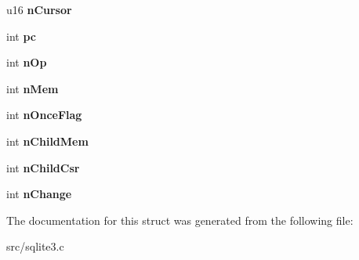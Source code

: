 \begin{DoxyCompactItemize}
\item 
\hypertarget{struct_vdbe_frame_af6d743df3f86ff683959562c1b615655}{u16 {\bfseries n\-Cursor}}\label{struct_vdbe_frame_af6d743df3f86ff683959562c1b615655}

\item 
\hypertarget{struct_vdbe_frame_aed0e6d8cb1908580a3c2aca04516b46c}{int {\bfseries pc}}\label{struct_vdbe_frame_aed0e6d8cb1908580a3c2aca04516b46c}

\item 
\hypertarget{struct_vdbe_frame_acffd5d53fbb5cb55e257c34a547c1762}{int {\bfseries n\-Op}}\label{struct_vdbe_frame_acffd5d53fbb5cb55e257c34a547c1762}

\item 
\hypertarget{struct_vdbe_frame_ab340f2b5f6d6e09a872f5f8a64fec245}{int {\bfseries n\-Mem}}\label{struct_vdbe_frame_ab340f2b5f6d6e09a872f5f8a64fec245}

\item 
\hypertarget{struct_vdbe_frame_a04707991a2907a48a1c3b76f3da4d26b}{int {\bfseries n\-Once\-Flag}}\label{struct_vdbe_frame_a04707991a2907a48a1c3b76f3da4d26b}

\item 
\hypertarget{struct_vdbe_frame_a833bdf519676567bc3a700cdedc6562d}{int {\bfseries n\-Child\-Mem}}\label{struct_vdbe_frame_a833bdf519676567bc3a700cdedc6562d}

\item 
\hypertarget{struct_vdbe_frame_a2d2900348092258d12eb71057812429a}{int {\bfseries n\-Child\-Csr}}\label{struct_vdbe_frame_a2d2900348092258d12eb71057812429a}

\item 
\hypertarget{struct_vdbe_frame_a77aacb67d627f4446dd50a795b5a2f0f}{int {\bfseries n\-Change}}\label{struct_vdbe_frame_a77aacb67d627f4446dd50a795b5a2f0f}

\end{DoxyCompactItemize}


The documentation for this struct was generated from the following file\-:\begin{DoxyCompactItemize}
\item 
src/sqlite3.\-c\end{DoxyCompactItemize}
